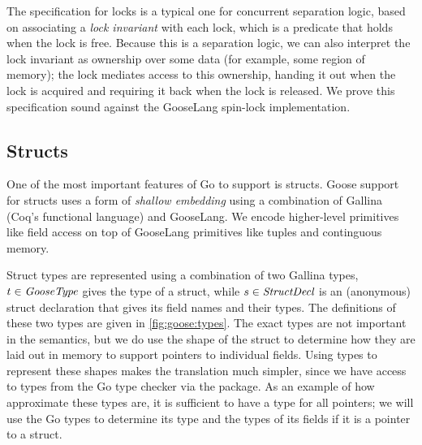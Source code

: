 The specification for locks is a typical one for concurrent separation logic,
based on associating a \emph{lock invariant} with each lock, which is a predicate that holds when the lock
is free. Because this is a separation logic, we can also interpret the lock
invariant as ownership over some data (for example, some region of memory); the
lock mediates access to this ownership, handing it out when the lock is acquired
and requiring it back when the lock is released. We prove this specification
sound against the GooseLang spin-lock implementation.

\subsection{Structs}


One of the most important features of Go to support is structs. Goose support
for structs uses a form of \emph{shallow embedding} using a combination of
Gallina (Coq's functional language) and GooseLang. We encode
higher-level primitives like field access on top of GooseLang primitives like
tuples and continguous memory.

Struct types are represented using a combination of two Gallina types,
$t \in \textit{GooseType}$ gives the type of a struct, while
$s \in \textit{StructDecl}$ is an (anonymous) struct declaration that gives its
field names and their types. The definitions of these two types are given in
\autoref{fig:goose:types}. The exact types are not important in the semantics,
but we do use the shape of the struct to determine how they are laid out in
memory to support pointers to individual fields. Using types to represent these
shapes makes the translation much simpler, since we have access to types from
the Go type checker via the  package. As an example of how
approximate these types are, it is sufficient to have a  type for
all pointers; we will use the Go types to determine its type and the types of
its fields if it is a pointer to a struct.

